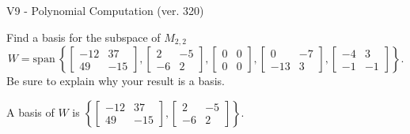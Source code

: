 \begin{exercise}
  \begin{exerciseTitle}V9 - Polynomial Computation (ver. 320)\end{exerciseTitle}
  \begin{exerciseStatement}
    Find a basis for the subspace of \(M_{2,2}\) 
\[W=\mathrm{span}\ \left\{\left[\begin{array}{cc}
-12 & 37 \\
49 & -15
\end{array}\right] , \left[\begin{array}{cc}
2 & -5 \\
-6 & 2
\end{array}\right] , \left[\begin{array}{cc}
0 & 0 \\
0 & 0
\end{array}\right] , \left[\begin{array}{cc}
0 & -7 \\
-13 & 3
\end{array}\right] , \left[\begin{array}{cc}
-4 & 3 \\
-1 & -1
\end{array}\right]\right\}.\]
 Be sure to explain why your result is a basis.


  \end{exerciseStatement}
  \begin{exerciseAnswer}
   A basis of \(W\) is  \(\left\{\left[\begin{array}{cc}
-12 & 37 \\
49 & -15
\end{array}\right] , \left[\begin{array}{cc}
2 & -5 \\
-6 & 2
\end{array}\right]\right\}\).
  


  \end{exerciseAnswer}
\end{exercise}
